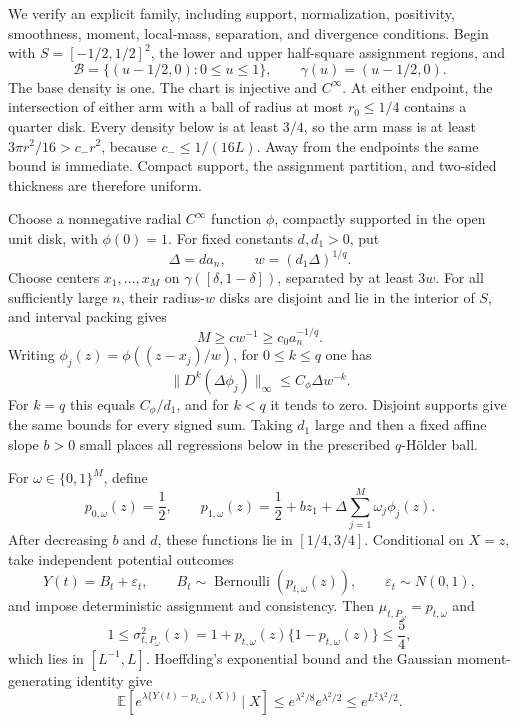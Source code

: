 We verify an explicit family, including support, normalization, positivity, smoothness, moment, local-mass, separation, and divergence conditions.  Begin with \(S=[-1/2,1/2]^2\), the lower and upper half-square assignment regions, and
\[
 \mathcal B=\{(u-1/2,0):0\leq u\leq1\},
 \qquad \gamma(u)=(u-1/2,0).
\]
The base density is one.  The chart is injective and \(C^\infty\).  At either endpoint, the intersection of either arm with a ball of radius at most \(r_0\leq1/4\) contains a quarter disk.  Every density below is at least \(3/4\), so the arm mass is at least \(3\pi r^2/16>c_-r^2\), because \(c_-\leq1/(16L)\).  Away from the endpoints the same bound is immediate.  Compact support, the assignment partition, and two-sided thickness are therefore uniform.

Choose a nonnegative radial \(C^\infty\) function \(\phi\), compactly supported in the open unit disk, with \(\phi(0)=1\).  For fixed constants \(d,d_1>0\), put
\[
 \Delta=d a_n,
 \qquad w=(d_1\Delta)^{1/q}.
\]
Choose centers \(x_1,\ldots,x_M\) on \(\gamma([\delta,1-\delta])\), separated by at least \(3w\).  For all sufficiently large \(n\), their radius-\(w\) disks are disjoint and lie in the interior of \(S\), and interval packing gives
\[
 M\geq c w^{-1}\geq c_0a_n^{-1/q}.
\]
Writing \(\phi_j(z)=\phi((z-x_j)/w)\), for \(0\leq k\leq q\) one has
\[
 \lVert D^k(\Delta\phi_j)\rVert_\infty
 \leq C_\phi\Delta w^{-k}.
\]
For \(k=q\) this equals \(C_\phi/d_1\), and for \(k<q\) it tends to zero.  Disjoint supports give the same bounds for every signed sum.  Taking \(d_1\) large and then a fixed affine slope \(b>0\) small places all regressions below in the prescribed \(q\)-H\"older ball.

For \(\omega\in\{0,1\}^M\), define
\[
 p_{0,\omega}(z)=\frac12,
 \qquad
 p_{1,\omega}(z)=\frac12+bz_1+\Delta\sum_{j=1}^M\omega_j\phi_j(z).
\]
After decreasing \(b\) and \(d\), these functions lie in \([1/4,3/4]\).  Conditional on \(X=z\), take independent potential outcomes
\[
 Y(t)=B_t+\varepsilon_t,
 \qquad B_t\sim\operatorname{Bernoulli}(p_{t,\omega}(z)),
 \qquad \varepsilon_t\sim N(0,1),
\]
and impose deterministic assignment and consistency.  Then \(\mu_{t,P_\omega}=p_{t,\omega}\) and
\[
 1\leq\sigma^2_{t,P_\omega}(z)
 =1+p_{t,\omega}(z)\{1-p_{t,\omega}(z)\}
 \leq\frac54,
\]
which lies in \([L^{-1},L]\).  Hoeffding's exponential bound and the Gaussian moment-generating identity give
\[
 \mathbb E\!\left[e^{\lambda\{Y(t)-p_{t,\omega}(X)\}}\mid X\right]
 \leq e^{\lambda^2/8}e^{\lambda^2/2}
 \leq e^{L^2\lambda^2/2}.
\]

